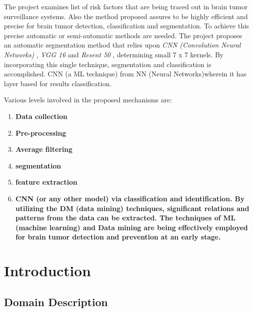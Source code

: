 \documentclass[11pt]{article}
\begin{document}
	The project examines list of risk factors that are being traced out in brain
	tumor surveillance systems. Also the method proposed assures to be highly
	efficient and precise for brain tumor detection, classification and
	segmentation. To achieve this precise automatic or semi-automatic methods
	are needed. The project proposes an automatic segmentation method that
	relies upon \textit{ CNN (Convolution Neural Networks) }, \textit{ VGG 16 }
	and \textit{ Resent 50 }, determining small 7 x 7 kernels. By incorporating
	this single technique, segmentation and classification is accomplished. CNN
	(a ML technique) from NN (Neural Networks)wherein it has layer based for
	results classification.

	Various levels involved in the proposed mechanisms are:

	\begin{enumerate}
		\item \textbf{ Data collection }
		\item \textbf{ Pre-processing }
		\item \textbf{ Average filtering }
		\item \textbf{ segmentation }
		\item \textbf{ feature extraction }
		\item \textbf{CNN (or any other model) via classification and identification. By
			utilizing the DM (data mining) techniques, significant relations and
			patterns from the data can be extracted. The techniques of ML
			(machine learning) and Data mining are being effectively employed
			for brain tumor detection and prevention at an early stage.}
	\end{enumerate}

	\section[introduction]{Introduction}
	\subsection[domain description]{Domain Description}
\end{document}
